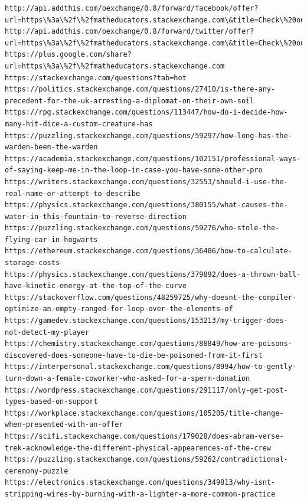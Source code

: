 \documentclass[11pt]{article}
\begin{document}
\begin{Verbatim}[commandchars=\\\{\}]
http://api.addthis.com/oexchange/0.8/forward/facebook/offer?url=https\%3a\%2f\%2fmatheducators.stackexchange.com\&title=Check\%20out\%20the\%20new\%20Mathematics\%20Educators\%20Stack\%20Exchange\%20Q\%26A\%20site\%20from\%20Stack\%20Exchange\&username=stackoverflow
http://api.addthis.com/oexchange/0.8/forward/twitter/offer?url=https\%3a\%2f\%2fmatheducators.stackexchange.com\&title=Check\%20out\%20the\%20new\%20Mathematics\%20Educators\%20Stack\%20Exchange\%20QnA\%20site\%20from\%20\%40StackExchange\&username=stackoverflow\&template=\%7B\%7Btitle\%7D\%7D\%20\%7B\%7Burl\%7D\%7D
https://plus.google.com/share?url=https\%3a\%2f\%2fmatheducators.stackexchange.com
https://stackexchange.com/questions?tab=hot
https://politics.stackexchange.com/questions/27410/is-there-any-precedent-for-the-uk-arresting-a-diplomat-on-their-own-soil
https://rpg.stackexchange.com/questions/113447/how-do-i-decide-how-many-hit-dice-a-custom-creature-has
https://puzzling.stackexchange.com/questions/59297/how-long-has-the-warden-been-the-warden
https://academia.stackexchange.com/questions/102151/professional-ways-of-saying-keep-me-in-the-loop-in-case-you-have-some-other-pro
https://writers.stackexchange.com/questions/32553/should-i-use-the-real-name-or-attempt-to-describe
https://physics.stackexchange.com/questions/380155/what-causes-the-water-in-this-fountain-to-reverse-direction
https://puzzling.stackexchange.com/questions/59276/who-stole-the-flying-car-in-hogwarts
https://ethereum.stackexchange.com/questions/36406/how-to-calculate-storage-costs
https://physics.stackexchange.com/questions/379892/does-a-thrown-ball-have-kinetic-energy-at-the-top-of-the-curve
https://stackoverflow.com/questions/48259725/why-doesnt-the-compiler-optimize-an-empty-ranged-for-loop-over-the-elements-of
https://gamedev.stackexchange.com/questions/153213/my-trigger-does-not-detect-my-player
https://chemistry.stackexchange.com/questions/88849/how-are-poisons-discovered-does-someone-have-to-die-be-poisoned-from-it-first
https://interpersonal.stackexchange.com/questions/8994/how-to-gently-turn-down-a-female-coworker-who-asked-for-a-sperm-donation
https://wordpress.stackexchange.com/questions/291117/only-get-post-types-based-on-support
https://workplace.stackexchange.com/questions/105205/title-change-when-presented-with-an-offer
https://scifi.stackexchange.com/questions/179028/does-abram-verse-trek-acknowledge-the-different-physical-appearences-of-the-crew
https://puzzling.stackexchange.com/questions/59262/contradictional-ceremony-puzzle
https://electronics.stackexchange.com/questions/349813/why-isnt-stripping-wires-by-burning-with-a-lighter-a-more-common-practice

\end{Verbatim}
\end{document}
